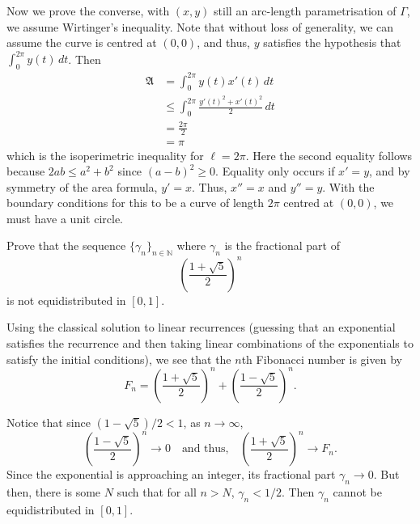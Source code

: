 \documentclass[12 pt, letterpaper]{hmcpset}
\begin{document}
\begin{solution}
	Now we prove the converse, with $(x, y)$ still an arc-length parametrisation of $\Gamma$, we assume Wirtinger's inequality. Note that without loss of generality, we can assume the curve is centred at $(0, 0)$, and thus, $y$ satisfies the hypothesis that $\int_{0}^{2 \pi} y(t) \, dt $. Then
	\begin{align*}
		\mathfrak{A} & = \int_{0}^{2 \pi} y(t) x'(t) \, dt \\
			     & \le \int_{0}^{2 \pi} \frac{y'(t)^{2} + x'(t)^{2}}{2} \, dt \\
			     & = \frac{2 \pi}{2} \\
			     & = \pi
	\end{align*}
	which is the isoperimetric inequality for $\ell = 2 \pi$. Here the second equality follows because  $2 a b \le a^{2} + b^{2}$ since $(a - b)^{2} \ge 0$. Equality only occurs if $x' = y$, and by symmetry of the area formula, $y' = x$. Thus, $x'' = x$ and $y'' = y$. With the boundary conditions for this to be a curve of length $2 \pi$ centred at $(0, 0)$, we must have a unit circle.
\end{solution}

\pagebreak

\begin{problem}[S \& S \S 4.5 \#5.]
	Prove that the sequence $\{ \gamma_{n} \}_{n \in \mathbb{N}}$ where $\gamma_{n}$ is the fractional part of
	\[
		\left ( \frac{1 + \sqrt{5}}{2} \right )^{n}
	\]
	is not equidistributed in $[0, 1]$.
\end{problem}

\begin{solution}
	Using the classical solution to linear recurrences (guessing that an exponential satisfies the recurrence and then taking linear combinations of the exponentials to satisfy the initial conditions), we see that the $n$th Fibonacci number is given by
	\[
		F_{n} = \left ( \frac{1 + \sqrt{5}}{2} \right )^{n} + \left ( \frac{1 - \sqrt{5}}{2} \right )^{n}.
	\]

	Notice that since $(1 - \sqrt{5})/2 < 1$, as $n \to \infty$,
	\[
		\left ( \frac{1 - \sqrt{5}}{2} \right )^{n} \to 0 \quad \text{and thus,} \quad \left ( \frac{1 + \sqrt{5}}{2} \right )^{n} \to F_{n}.
	\]
	Since the exponential is approaching an integer, its fractional part $\gamma_{n} \to 0$. But then, there is some $N$ such that for all $n > N$, $\gamma_{n} < 1 / 2$. Then $\gamma_{n}$ cannot be equidistributed in $[0, 1]$.
\end{solution}

\pagebreak
\end{document}
